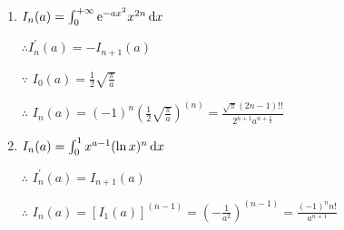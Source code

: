 \begin{enumerate}[1]
\begin{enumerate}[(1)]
        \item
        $I_n(a)=\int_0^{+\infty} \me^{-ax^2}x^{2n}\dif x$
        \par $\therefore I_n^{'}(a)=-I_{n+1}(a)$
        \par $\because$ $I_0(a)=\frac{1}{2}\sqrt{\frac{\pi}{a}}$
        \par $\therefore$ $I_n(a)=(-1)^n (\frac{1}{2}\sqrt{\frac{\pi}{a}})^{(n)}=\frac{\sqrt{\pi}(2n-1)!!}{2^{n+1} a^{n+\frac{1}{2}}}$

        \item
        $I_n(a)=\int_0^1 x^{a-1}(\ln x)^n\dif x$
        \par $\therefore$ $I_n^{'}(a)=I_{n+1}(a)$
        \par $\therefore$ $I_n(a)=[I_1(a)]^{(n-1)}=(-\frac{1}{a^2})^{(n-1)}=\frac{(-1)^nn!}{a^{n+1}}$
        \end{enumerate}
    \end{enumerate}

